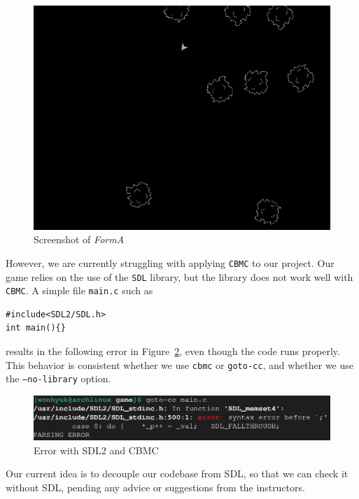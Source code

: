 \documentclass{article}
\newcommand{\Name}{\textit{FormA}\xspace}
\begin{document}
\begin{figure}[!h]
    \includegraphics[width=\linewidth]{gameplay.png}
    \caption{Screenshot of \Name}
    \label{fig:gameplay}
\end{figure}

However, we are currently struggling with applying \texttt{CBMC} to our project.
Our game relies on the use of the \texttt{SDL} library, but the library does not work well with \texttt{CBMC}.
A simple file \texttt{main.c} such as 
\begin{verbatim}
#include<SDL2/SDL.h>
int main(){}
\end{verbatim}
results in the following error in Figure~\ref{fig:cbmc-sdl}, even though the code runs properly.
This behavior is consistent whether we use \texttt{cbmc} or \texttt{goto-cc}, and whether we use the \texttt{--no-library} option.

\begin{figure}[!h]
    \includegraphics[width=\linewidth]{cbmc-sdl.png}
    \caption{Error with SDL2 and CBMC}
    \label{fig:cbmc-sdl}
\end{figure}

Our current idea is to decouple our codebase from SDL, so that we can check it without SDL, pending any advice or suggestions from the instructors.



\end{document}
